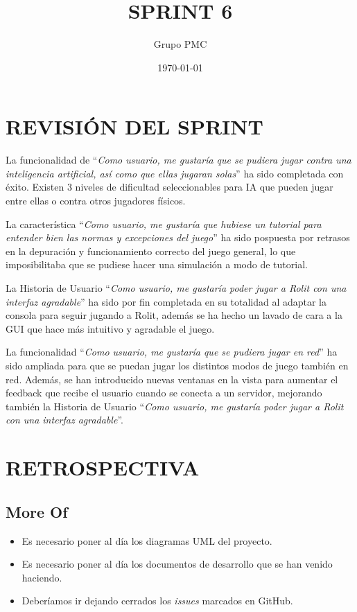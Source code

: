 \documentclass{article}
\title{SPRINT 6}
\date{\today}
\author{Grupo PMC}
\begin{document}
\maketitle
\section{REVISIÓN DEL SPRINT}
La funcionalidad de ``\textit{Como usuario, me gustaría que se pudiera jugar contra una inteligencia artificial, así como que ellas jugaran solas}'' ha sido completada con éxito. Existen 3 niveles de dificultad seleccionables para IA que pueden jugar entre ellas o contra otros jugadores físicos.

La característica ``\textit{Como usuario, me gustaría que hubiese un tutorial para entender bien las normas y excepciones del juego}'' ha sido pospuesta por retrasos en la depuración y funcionamiento correcto del juego general, lo que imposibilitaba que se pudiese hacer una simulación a modo de tutorial.

La Historia de Usuario ``\textit{Como usuario, me gustaría poder jugar a Rolit con una interfaz agradable}'' ha sido por fin completada en su totalidad al adaptar la consola para seguir jugando a Rolit, además se ha hecho un lavado de cara a la GUI que hace más intuitivo y agradable el juego.

La funcionalidad ``\textit{Como usuario, me gustaría que se pudiera jugar en red}'' ha sido ampliada para que se puedan jugar los distintos modos de juego también en red. Además, se han introducido nuevas ventanas en la vista para aumentar el feedback que recibe el usuario cuando se conecta a un servidor, mejorando también la Historia de Usuario ``\textit{Como usuario, me gustaría poder jugar a Rolit con una interfaz agradable}''.

\section{RETROSPECTIVA}
\subsection{More Of}
\begin{itemize}
\item Es necesario poner al día los diagramas UML del proyecto.
\item Es necesario poner al día los documentos de desarrollo que se han venido haciendo.
\item Deberíamos ir dejando cerrados los \textit{issues} marcados en GitHub.
\end{itemize}
\end{document}
